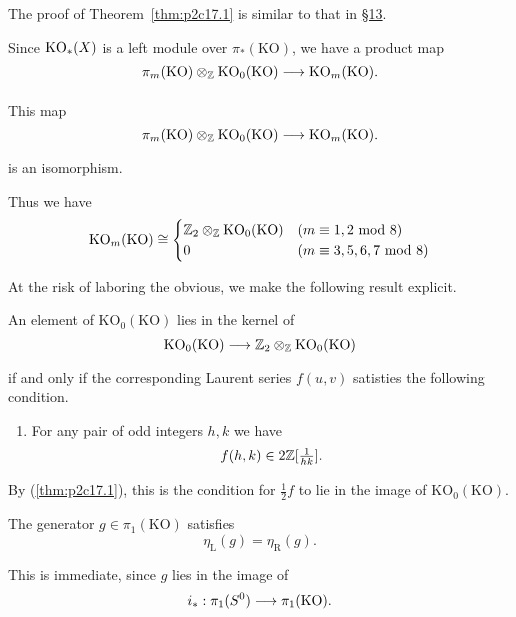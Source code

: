 \documentclass[../main]{subfiles}
\begin{document}
The proof of Theorem~\ref{thm:p2c17.1} is similar to that in \hyperref[sec:p2c13]{\S 13}.

Since $\mathrm{KO}_\ast(X)$ is a left module over $\pi_\ast(\mathrm{KO})$, we have a product map
\[
\pi_m(\mathrm{KO}) \otimes_\bbZ \mathrm{KO}_0(\mathrm{KO})
\lar{}
\mathrm{KO}_m(\mathrm{KO}).
\]

\setcounter{theorem}{6} %
\begin{theorem}
\label{thm:p2c17.7}
This map 
\[
\pi_m(\mathrm{KO}) \otimes_\bbZ \mathrm{KO}_0(\mathrm{KO})
\lar{}
\mathrm{KO}_m(\mathrm{KO}).
\]
is an isomorphism.
\end{theorem}

Thus we have
\[
\mathrm{KO}_m(\mathrm{KO})
\cong
\begin{cases}
\bbZ_2 \otimes_\bbZ \mathrm{KO}_0(\mathrm{KO}) &(m\equiv 1,2 \ \text{mod 8})     \\
0                                              &(m\equiv 3,5,6,7 \ \text{mod 8})
\end{cases}
\]

At the risk of laboring the obvious, we make the following result explicit.
\begin{proposition}
\label{prop:p2c17.8}
An element of $\mathrm{KO}_0(\mathrm{KO})$ lies in the kernel of
\[
\mathrm{KO}_0(\mathrm{KO})
\lar{}
\bbZ_2 \otimes_\bbZ \mathrm{KO}_0(\mathrm{KO})
\]
if and only if the corresponding Laurent series $f(u,v)$ satisties the following condition.
    \begin{enumerate}[label=(\thechapter.\arabic*), start=9]
        \item \label{part 2 condition 17.9}
        For any pair of odd integers $h,k$ we have
        \[
        f(h,k) \in 2\mathbb{Z}[\tfrac{1}{hk}].
        \]
    \end{enumerate}
\end{proposition}

By (\ref{thm:p2c17.1}), this is the condition for $\frac 12 f$ to lie in the image of $\mathrm{KO}_0(\mathrm{KO})$.


\setcounter{theorem}{9} %
\begin{proposition}
\label{prop:p2ch17.10}
The generator $g\in \pi_1(\mathrm{KO})$ satisfies
\[
\eta_{\mathrm L}(g) = \eta_{\mathrm R}(g).
\]
\end{proposition}

This is immediate, since $g$ lies in the image of
\[
i_\ast: \pi_1(S^0) \lar{} \pi_1(\mathrm{KO}).
\]
\end{document}
